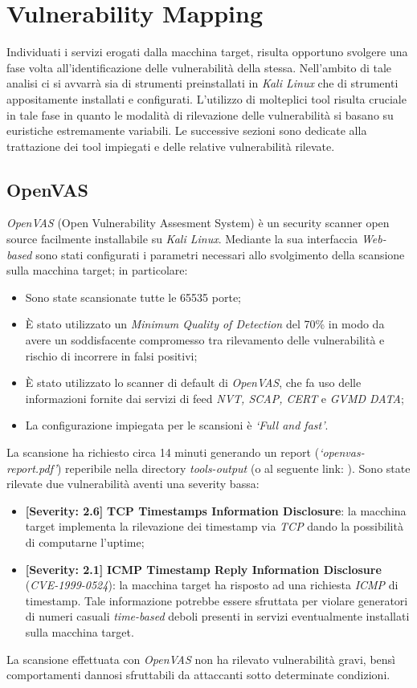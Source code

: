 \section{Vulnerability Mapping}
Individuati i servizi erogati dalla macchina target, risulta opportuno svolgere una fase volta all'identificazione delle vulnerabilità della stessa. Nell'ambito di tale analisi ci si avvarrà sia di strumenti preinstallati in \emph{Kali Linux} che di strumenti appositamente installati e configurati. L'utilizzo di molteplici tool risulta cruciale in tale fase in quanto le modalità di rilevazione delle vulnerabilità si basano su euristiche estremamente variabili. Le successive sezioni sono dedicate alla trattazione dei tool impiegati e delle relative vulnerabilità rilevate.
\subsection{OpenVAS}
\emph{OpenVAS} (Open Vulnerability Assesment System) è un security scanner open source facilmente installabile su \emph{Kali Linux}. Mediante la sua interfaccia \emph{Web-based} sono stati configurati i parametri necessari allo svolgimento della scansione sulla macchina target; in particolare:
\begin{itemize}
    \item Sono state scansionate tutte le 65535 porte;
    \item È stato utilizzato un \emph{Minimum Quality of Detection} del 70\% in modo da avere un soddisfacente compromesso tra rilevamento delle vulnerabilità e rischio di incorrere in falsi positivi;
    \item È stato utilizzato lo scanner di default di \emph{OpenVAS}, che fa uso delle informazioni fornite dai servizi di feed \emph{NVT, SCAP, CERT} e \emph{GVMD DATA};
    \item La configurazione impiegata per le scansioni è \emph{`Full and fast'}.
\end{itemize}
La scansione ha richiesto circa 14 minuti generando un report (\emph{`openvas-report.pdf'}) reperibile nella directory \emph{tools-output} (o al seguente link: ). Sono state rilevate due vulnerabilità aventi una severity bassa:
\begin{itemize}
    \item \textbf{[Severity: 2.6]} \textbf{TCP Timestamps Information Disclosure}: la macchina target implementa la rilevazione dei timestamp via \emph{TCP} dando la possibilità di computarne l'uptime;
    \item \textbf{[Severity: 2.1]} \textbf{ICMP Timestamp Reply Information Disclosure} (\emph{CVE-1999-0524}): la macchina target ha risposto ad una richiesta \emph{ICMP} di timestamp. Tale informazione potrebbe essere sfruttata per violare generatori di numeri casuali \emph{time-based} deboli presenti in servizi eventualmente installati sulla macchina target.
\end{itemize}
La scansione effettuata con \emph{OpenVAS} non ha rilevato vulnerabilità gravi, bensì comportamenti dannosi sfruttabili da attaccanti sotto determinate condizioni.
